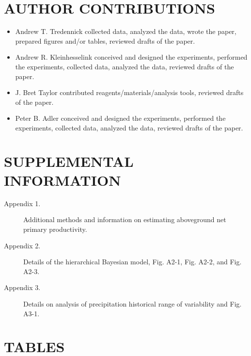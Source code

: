 \documentclass[fleqn,10pt,lineno]{wlpeerj} %
\begin{document}
\section{AUTHOR CONTRIBUTIONS}\label{author-contributions}

\begin{itemize}
  \item Andrew T. Tredennick collected data, analyzed the data, wrote the paper, prepared figures and/or tables, reviewed drafts of the paper.
  \item Andrew R. Kleinhesselink conceived and designed the experiments, performed the experiments, collected data, analyzed the data, reviewed drafts of the paper.
  \item J. Bret Taylor contributed reagents/materials/analysis tools, reviewed drafts of the paper.
  \item Peter B. Adler conceived and designed the experiments, performed the experiments, collected data, analyzed the data, reviewed drafts of the paper.
\end{itemize}

\section{SUPPLEMENTAL INFORMATION}\label{supplemental-information}

\begin{description}
\item [Appendix 1.] Additional methods and information on estimating aboveground net primary productivity.
\item [Appendix 2.] Details of the hierarchical Bayesian model, Fig. A2-1, Fig. A2-2, and Fig. A2-3.
\item [Appendix 3.] Details on analysis of precipitation historical range of variability and Fig. A3-1.
\end{description}

\newpage{}

\section{TABLES}\label{tables}
\end{document}
